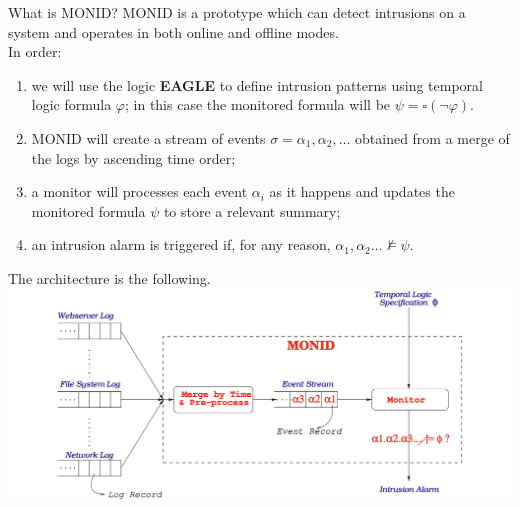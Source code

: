 \documentclass[aspectratio=169,t,xcolor=table]{beamer}
\begin{document}
\begin{frame}[allowframebreaks]{What is MONID?}
    MONID is a prototype which can detect intrusions on a system and operates in both online and offline modes.\\
    \vspace{5mm}
    In order:
    \begin{enumerate}
        \item we will use the logic \textbf{EAGLE} to define intrusion patterns using temporal logic formula $\varphi$; in this case the monitored formula will be $\psi=\square (\neg\varphi)$.
        \item MONID will create a stream of events $\sigma=\alpha_{1},\alpha_{2},\ldots$ obtained from a merge of the logs by ascending time order;
        \item a monitor will processes each event $\alpha_i$ as it happens and updates the monitored formula $\psi$ to store a relevant summary;
        \item an intrusion alarm is triggered if, for any reason, $\alpha_{1},\alpha_{2} \ldots\not\models\psi$.
    \end{enumerate}

    The architecture is the following.\\
    \vspace{2.5mm}
    \includegraphics[scale=0.25]{images/monid.png}
\end{frame}
\end{document}
